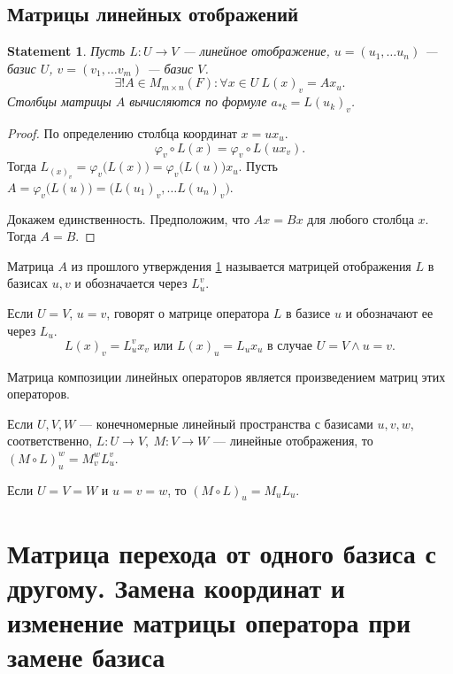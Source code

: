 \documentclass[11pt]{book}
\theoremstyle{definition}
\theoremstyle{plain}
\theoremstyle{plain}
\newtheorem{st}{Statement}
\theoremstyle{definition}
\theoremstyle{remark}
\begin{document}
\subsection{Матрицы линейных отображений}
\begin{st}\label{st_m_o}
    Пусть $ L : U \to  V$ --- линейное отображение, $ u = (u_1, \ldots u_n) $ --- базис $ U$,  $ v=(v_1, \ldots v_m)$ --- базис $ V$.
    \[
	\exists ! A \in M_{m \times n}(F): \forall x \in U ~ L(x)_v = Ax_u
    .\]
    Столбцы матрицы $ A$ вычисляются по формуле $ a_{*k}=L(u_k)_v$.
\end{st}
\begin{proof}
    По определению столбца координат $ x = ux_u$.   \[
	\varphi _v \circ L(x) = \varphi _v \circ L(ux_v)
    .\]
    Тогда $ L_(x)_v = \varphi _v\bigl(L(x)\bigr) = \varphi _v\bigl(L(u)\bigr)x_u$.
    Пусть $ A = \varphi _v\bigl(L(u)\bigr) = \bigl( L(u_1)_v, \ldots L(u_n)_v \bigr)$.

    Докажем единственность. Предположим, что $ Ax = Bx$ для любого столбца  $ x$. Тогда  $ A = B$.
\end{proof}
\begin{defn}
    Матрица $ A$ из прошлого утверждения \ref{st_m_o} называется {\sf матрицей отображения} $ L$ в базисах  $ u, v$ и обозначается через  $ L_u^{v}$.

    Если $ U = V$,  $ u = v$, говорят о матрице оператора  $ L$ в базисе  $ u$ и обозначают ее через  $ L_u$.
    \[
	L(x)_v = L_u^{v}x_v \text{ или } L(x)_u = L_ux_u \text{ в случае } U=V \wedge u=v
    .\]
\end{defn}
\begin{thm}
    Матрица композиции линейных операторов является произведением матриц этих операторов.

    Если $ U, V, W$ --- конечномерные линейный пространства с базисами  $ u, v, w$, соответственно,  $ L: U \to V, ~ M: V \to W$ --- линейные отображения,  то $ (M \circ L)_u^{w}= M_v^{w}L_u^{v}$.

    Если $ U = V = W$ и  $ u = v = w$, то  $ (M \circ L)_u=M_uL_u$.
\end{thm}
\section{Матрица перехода от одного базиса с другому. Замена координат и изменение матрицы оператора при замене базиса}
\end{document}
